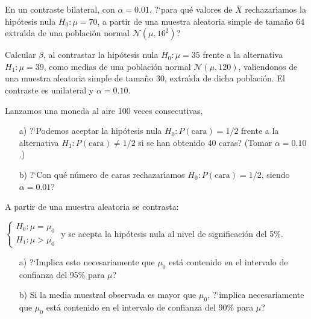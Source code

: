 \begin{prob}%
    En un contraste bilateral, con $\alpha = 0.01$, ?`para qu\'e
    valores de $\overline{X}$ rechazar\'{\i}amos la hip\'otesis nula
    $H_{0}: \mu = 70$, a partir de una muestra aleatoria simple de
    tama\~no 64 extra\'{\i}da de una poblaci\'on normal
    $\mathcal{N}(\mu, 16^2)$?
\end{prob}

\begin{prob}%
    Calcular $\beta$, al contrastar la hip\'otesis nula
    $H_{0}: \mu = 35$ frente a la alternativa $H_{1}: \mu = 39$, como
    medias de una poblaci\'on normal $\mathcal{N}(\mu, 120)$,
    valiendonos de una muestra aleatoria simple de tama\~no 30,
    extra\'{\i}da de dicha poblaci\'on. El contraste es unilateral
    y $\alpha = 0.10$.
\end{prob}

\begin{prob}%
    Lanzamos una moneda al aire 100 veces consecutivas,
    \begin{itemize}
        \item  [a)] ?`Podemos aceptar la hip\'otesis nula
    $H_{0}: P(\text{cara}) = 1/2$ frente a la alternativa
    $H_{1}: P(\text{cara}) \neq 1/2$ si se han obtenido 40 caras?
    (Tomar $\alpha = 0.10$.)

        \item  [b)] ?`Con qu\'e n\'umero de caras rechazar\'{\i}amos
    $H_{0}: P(\text{cara}) = 1/2$, siendo $\alpha = 0.01$?
    \end{itemize}
\end{prob}

\begin{prob}%
    A partir de una muestra aleatoria se contrasta:

    $\left\{
    \begin{array}{l}
    H_{0}: \mu = \mu_{0}    \\
    H_{1}: \mu > \mu_{0}
    \end{array}
    \right.$
    \newline
    y se acepta la hip\'otesis nula al nivel de significaci\'{o}n del 5\%.
    \begin{itemize}
    \item [a)] ?`Implica esto necesariamente que $\mu_{0}$ est\'{a}
    contenido en el intervalo de confianza del 95\% para $\mu$?

    \item [b)] Si la media muestral observada es mayor que $\mu_{0}$,
    ?`implica necesariamente que $\mu_{0}$ est\'{a} contenido en el
    intervalo de confianza del 90\% para $\mu$?
    \end{itemize}
\end{prob}

